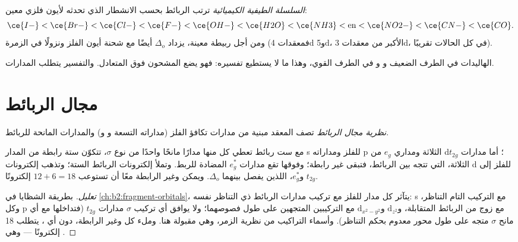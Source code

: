 \begin{definition}\label{def:b2:ligand-field:spectrochemical}
\emph{السلسلة الطيفية الكيميائية} ترتب الربائط بحسب
الانشطار الذي تحدثه لأيون فلزي معين:
\[
  \ce{I-} < \ce{Br-} < \ce{Cl-} < \ce{F-} < \ce{OH-} < \ce{H2O} < \ce{NH3} < \text{en} <
  \ce{NO2-} < \ce{CN-} < \ce{CO} .
\]
ومن أجل ربيطة معينة، يزداد $\Delta_o$ أيضًا مع شحنة أيون الفلز ونزولًا في الزمرة
(فمعقدات 4d و5d، الأكبر من معقدات 3d،  في كل الحالات تقريبًا).
\end{definition}

الهاليدات في الطرف الضعيف و و في الطرف القوي، وهذا ما
لا يستطيع  تفسيره: فهو يضع  المشحون فوق 
المتعادل. والتفسير يتطلب المدارات.

\section{مجال الربائط}

\begin{definition}\label{def:b2:ligand-field:ligand-field}
\emph{نظرية مجال الربائط} تصف المعقد 
مبنية من مدارات تكافؤ الفلز (مداراته التسعة  و و)
والمدارات المانحة للربائط.
\end{definition}

\begin{proposition}\label{prop:b2:ligand-field:mo-octahedral}
مع ست ربائط تعطي كل منها مدارًا مانحًا واحدًا من نوع $\sigma$، تتكوّن ستة  رابطة
من المدار s للفلز ومداراته p الثلاثة ومداري $e_g$ من d؛ أما مدارات $t_{2g}$ الثلاثة، التي
تتجه بين الربائط، فتبقى غير رابطة؛ وفوقها تقع مدارات $e_g^*$ المضادة
للربط. وتملأ إلكترونات الربائط  الستة؛ وتذهب إلكترونات d للفلز
إلى $t_{2g}$ و$e_g^*$، اللذين يفصل بينهما $\Delta_o$. ويمكن  وغير الرابطة معًا أن تستوعب
$12 + 6 = 18$ إلكترونًا.
\end{proposition}

\begin{proof}[تعليل]
بطريقة الشظايا في \cref{ch:b2:fragment-orbitals}، يتآثر كل مدار للفلز
مع تركيب مدارات الربائط ذي التناظر نفسه: s مع التركيب التام
التناظر، وكل p مع زوج من الربائط المتقابلة، و$\mathrm d_{z^2}$ و$\mathrm
d_{x^2-y^2}$ مع التركيبين المتجهين على طول فصوصهما؛ ولا يوافق أي تركيب $\sigma$
مدارات $t_{2g}$ (فتداخلها مع أي مانح $\sigma$ متجه على طول محور
معدوم بحكم التناظر). وأسماء التراكيب من نظرية الزمر، وهي مقبولة هنا.
وملء كل  وغير الرابطة، دون أي ، يتطلب
18 إلكترونًا --- وهي .
\end{proof}

